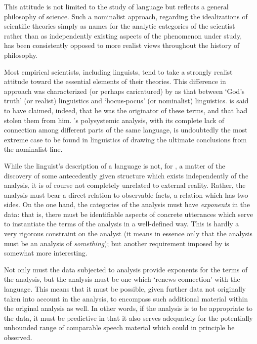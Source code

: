This attitude is not limited to the study of language but reflects a
general philosophy of science. Such a nominalist approach, regarding
the idealizations of scientific theories simply as names for the
analytic categories of the scientist rather than as independently
existing aspects of the phenomenon under study, has been consistently
opposed to more realist views throughout the history of
philosophy.

Most empirical scientists, including linguists, tend to take a
strongly realist attitude toward the essential elements of their
theories. This difference in approach was characterized (or perhaps
caricatured) by \citet{householder52:rvw.harris} as that between
`God's truth' (or realist) linguistics and `hocus-pocus' (or
nominalist) linguistics. {\Firth} is said to have claimed, indeed, that
he was the originator of these terms, and that {\Householder} had stolen
them from him. {\Firth}'s polysystemic analysis, with its complete lack
of connection among different parts of the same language, is
undoubtedly the most extreme case to be found in linguistics of
drawing the ultimate conclusions from the nominalist line.

While the linguist's description of a language is not, for {\Firth}, a
matter of the discovery of some antecedently given structure which
exists independently of the analysis, it is of course not completely
unrelated to external reality. Rather, the analysis must bear a direct
relation to observable facts, a relation which has two sides. On the
one hand, the categories of the analysis must have \emph{exponents} in
the data: that is, there must be identifiable aspects of concrete
utterances which serve to instantiate the terms of the analysis in a
well-defined way. This is hardly a very rigorous constraint on the
analyst (it means in essence only that the analysis must be an
analysis of \emph{something}); but another requirement imposed by {\Firth} is
somewhat more interesting.

Not only must the data subjected to analysis provide exponents for the
terms of the analysis, but the analysis must be one which `renews
connection' with the language. This means that it must be possible,
given further data not originally taken into account in the analysis,
to encompass such additional material within the original analysis as
well. In other words, if the analysis is to be appropriate to the
data, it must be predictive in that it also serves adequately for the
potentially unbounded range of comparable speech material which could
in principle be observed.

